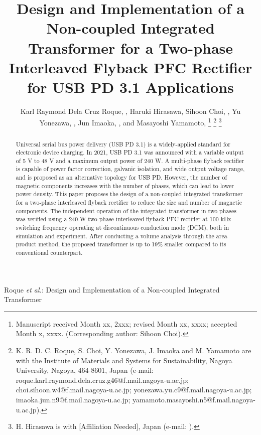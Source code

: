 \documentclass[lettersize,journal]{IEEEtran}
\begin{document}
\title{Design and Implementation of a Non-coupled Integrated Transformer for a Two-phase Interleaved Flyback PFC Rectifier for USB PD 3.1 Applications}

\author{Karl Raymond Dela Cruz Roque, , Haruki Hirasawa, Sihoon Choi, , Yu Yonezawa, , Jun Imaoka, , and Masayoshi Yamamoto, 
\thanks{Manuscript received Month xx, 2xxx; revised Month xx, xxxx; accepted Month x, xxxx. (Corresponding author: Sihoon Choi).}
\thanks{K. R. D. C. Roque, S. Choi, Y. Yonezawa, J. Imaoka and M. Yamamoto are with the Institute of Materials and Systems for Sustainability, Nagoya University, Nagoya, 464-8601, Japan (e-mail: roque.karl.raymond.dela.cruz.g46@f.mail.nagoya-u.ac.jp; choi.sihoon.w4@f.mail.nagoya-u.ac.jp; yonezawa.yu.c9@f.mail.nagoya-u.ac.jp; imaoka.jun.n9@f.mail.nagoya-u.ac.jp; yamamoto.masayoshi.n5@f.mail.nagoya-u.ac.jp).}
\thanks{H. Hirasawa is with [Affiliation Needed], Japan (e-mail: ).}}

%
{Roque \MakeLowercase{\textit{et al.}}: Design and Implementation of a Non-coupled Integrated Transformer}

\maketitle

\begin{abstract}
Universal serial bus power delivery (USB PD 3.1) is a widely-applied standard for electronic device charging. In 2021, USB PD 3.1 was announced with a variable output of 5 V to 48 V and a maximum output power of 240 W. A multi-phase flyback rectifier is capable of power factor correction, galvanic isolation, and wide output voltage range, and is proposed as an alternative topology for USB PD. However, the number of magnetic components increases with the number of phases, which can lead to lower power density. This paper proposes the design of a non-coupled integrated transformer for a two-phase interleaved flyback rectifier to reduce the size and number of magnetic components. The independent operation of the integrated transformer in two phases was verified using a 240-W two-phase interleaved flyback PFC rectifier at 100 kHz switching frequency operating at discontinuous conduction mode (DCM), both in simulation and experiment. After conducting a volume analysis through the area product method, the proposed transformer is up to 19\% smaller compared to its conventional counterpart.
\end{abstract}
\end{document}

